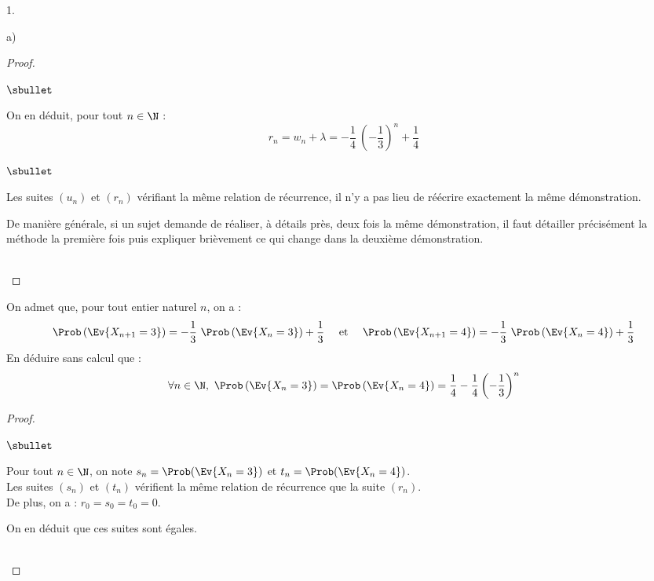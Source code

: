 \begin{noliste}{1.}
\begin{noliste}{a)}
\begin{proof}
\begin{noliste}{$\sbullet$}
      \item On en déduit, pour tout $n \in \N$ :
        \[
        r_n = w_n + \lambda = -\dfrac{1}{4} \ \left( - \dfrac{1}{3}
        \right)^n + \dfrac{1}{4}
        \]        
      \end{noliste}
    \begin{remark}%
      \begin{noliste}{$\sbullet$}
      \item Les suites $(u_n)$ et $(r_n)$ vérifiant la même relation
        de récurrence, il n'y a pas lieu de réécrire exactement la
        même démonstration.
      \item De manière générale, si un sujet demande de réaliser, à
        détails près, deux fois la même démonstration, il faut
        détailler précisément la méthode la première fois puis
        expliquer brièvement ce qui change dans la deuxième
        démonstration.
      \end{noliste}
    \end{remark}~\\[-1.4cm]
    \end{proof}

  \end{noliste}
  
\item On admet que, pour tout entier naturel $n$, on a :
  \[
  \Prob\left(\Ev{X_{n + 1} = 3}\right) = -\dfrac{1}{3} \ 
  \Prob\left(\Ev{X_{n} = 3}\right) + \dfrac{1}{3} \quad \hbox{ et }
  \quad \Prob\left(\Ev{X_{n + 1} = 4}\right) = -\dfrac{1}{3} \ 
  \Prob\left(\Ev{X_{n} = 4}\right) + \dfrac{1}{3}
  \]
  En déduire sans calcul que :
  \[
  \forall n \in \N, \ \Prob\left(\Ev{X_{n} = 3}\right) =
  \Prob\left(\Ev{X_{n} = 4}\right) =
  \dfrac{1}{4}-\dfrac{1}{4}\left(-\dfrac{1}{3}\right)^{n}
  \]

  \begin{proof}~%
    \begin{noliste}{$\sbullet$}
    \item Pour tout $n \in \N$, on note $s_n = \Prob(\Ev{X_n = 3})$ et
      $t_n = \Prob(\Ev{X_n = 4})$.\\
      Les suites $(s_n)$ et $(t_n)$ vérifient la même relation de
      récurrence que la suite $(r_n)$.\\
      De plus, on a : $r_0 = s_0 = t_0 = 0$.
    \item On en déduit que ces suites sont égales.
    \end{noliste}
    \conc{$\forall n \in \N$, $\Prob\left(\Ev{X_{n} = 2}\right) =
      \Prob\left(\Ev{X_{n} = 3}\right) = \Prob\left(\Ev{X_{n} =
          4}\right) = \dfrac{1}{4} -\dfrac{1}{4}
      \left(-\dfrac{1}{3}\right)^{n}$}~\\[-1cm]
  \end{proof}



\end{noliste}
